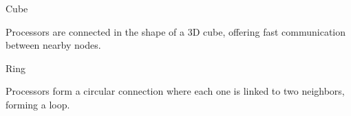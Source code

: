 \documentclass[a4paper, 10pt]{book}
\begin{document}
                    \vspace{0.3cm}
                    \noindent
                    \begin{minipage}{0.49\linewidth}
                        \begin{tcolorbox}[colframe=black!50, colback=white, size=small]
                            
                            {\bold Cube}
                            
                            Processors are connected in the shape of a 3D cube, offering fast communication between nearby nodes.

                            \begin{center}
                                \begin{tikzpicture}

                                    
                                    
                                \end{tikzpicture}
                            \end{center}

                        \end{tcolorbox}
                    \end{minipage}
                    \hfill
                    \begin{minipage}{0.49\linewidth}
                        \begin{tcolorbox}[colframe=black!50, colback=white, size=small]
                            
                            {\bold Ring}
                            
                            Processors form a circular connection where each one is linked to two neighbors, forming a loop.

                            \begin{center}
                                \begin{tikzpicture}

                                    
                                    
                                \end{tikzpicture}
                            \end{center}

                        \end{tcolorbox}
                    \end{minipage}
                    
\end{document}

